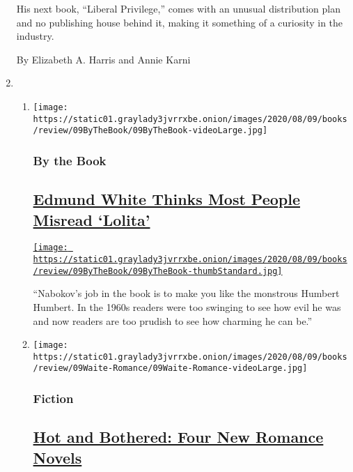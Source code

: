 \begin{enumerate}
  His next book, ``Liberal Privilege,'' comes with an unusual
  distribution plan and no publishing house behind it, making it
  something of a curiosity in the industry.

  By Elizabeth A. Harris and Annie Karni
\item
  \begin{enumerate}
  \def\labelenumii{\arabic{enumii}.}
  \item
    \texttt{[image: https://static01.graylady3jvrrxbe.onion/images/2020/08/09/books/review/09ByTheBook/09ByTheBook-videoLarge.jpg]}

    \hypertarget{by-the-book}{%
    \subsubsection{By the Book}\label{by-the-book}}

    \hypertarget{edmund-white-thinks-most-people-misread-lolita}{%
    \subsection{\texorpdfstring{\href{/2020/08/06/books/review/edmund-white-by-the-book-interview.html}{Edmund
    White Thinks Most People Misread
    `Lolita'}}{Edmund White Thinks Most People Misread `Lolita'}}\label{edmund-white-thinks-most-people-misread-lolita}}

    \href{/2020/08/06/books/review/edmund-white-by-the-book-interview.html}{\texttt{[image: https://static01.graylady3jvrrxbe.onion/images/2020/08/09/books/review/09ByTheBook/09ByTheBook-thumbStandard.jpg]}}

    ``Nabokov's job in the book is to make you like the monstrous
    Humbert Humbert. In the 1960s readers were too swinging to see how
    evil he was and now readers are too prudish to see how charming he
    can be.''
  \item
    \texttt{[image: https://static01.graylady3jvrrxbe.onion/images/2020/08/09/books/review/09Waite-Romance/09Waite-Romance-videoLarge.jpg]}

    \hypertarget{fiction}{%
    \subsubsection{Fiction}\label{fiction}}

    \hypertarget{hot-and-bothered-four-new-romance-novels}{%
    \subsection{\texorpdfstring{\href{/2020/08/07/books/review/summer-romance-novels-vanessa-riley.html}{Hot
    and Bothered: Four New Romance
    Novels}}{Hot and Bothered: Four New Romance Novels}}\label{hot-and-bothered-four-new-romance-novels}}


\end{enumerate}
\end{enumerate}
